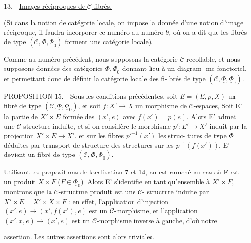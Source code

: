 13. - \underline{Images réciproques de $\mathcal{C}$-fibrés.}

(Si dans la notion de catégorie locale, on impose la donnée d'une
notion d'image réciproque, il faudra incorporer ce numéro au numéro 9,
où on a dit que les fibrés de type $(\mathcal{C}, \underline{\Phi}, \underline{\Phi}_0)$ forment une catégorie
locale).

Comme au numéro précédent, nous supposons la catégorie $\mathcal{C}$ recollable,
et nous supposons données des catégories $\underline{\Phi}, \underline{\Phi}_0$ donnant lieu à un diagram-
me fonctoriel, et permettant donc de définir la catégorie locale des fi-
brés de type $(\mathcal{C}, \underline{\Phi}, \underline{\Phi}_0)$.

PROPOSITION 15. - Sous les conditions précédentes, soit $E = (E,p,X)$ un
fibré de type $(\mathcal{C}, \underline{\Phi}, \underline{\Phi}_0)$, et soit $f:X' \to X$ un morphisme de $\mathcal{C}$-espaces,
Soit E' la partie de $X' \times E$ formée des $(x',e)$ avec $f(x') = p(e)$. Alors E'
admet une $\mathcal{C}$-structure induite, et si on considère le morphisme $p': E' \to X'$
induit par la projection $X' \times E \to X'$, et sur les fibres ${p'}^{-1}(x')$ les struc-
tures de type $\underline{\Phi}$ déduites par transport de structure des structures sur
les $p^{-1}(f(x'))$, E' devient un fibré de type $(\mathcal{C}, \underline{\Phi}, \underline{\Phi}_0)$.

Utilisant les propositions de localisation 7 et 14, on est ramené
au cas où E est un produit $X \times F$ ($F \in \underline{\Phi}_0$). Alors E' s'identifie en tant
qu'ensemble à $X' \times F$, montrons que la $\mathcal{C}$-structure produit est une $\mathcal{C}$-
structure induite par $X' \times E = X' \times X \times F$ : en effet, l'application d'injection
$(x',e) \to (x',f(x'),e)$ est un $\mathcal{C}$-morphisme, et l'application
$(x',x,e) \to (x',e)$ est un $\mathcal{C}$-morphisme inverse à gauche, d'où notre

\newpage



assertion. Les autres assertions sont alors triviales.

